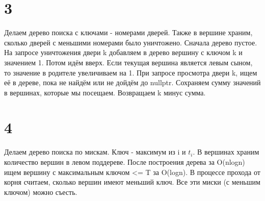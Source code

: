 \documentclass[12pt]{extarticle}
\begin{document}
\section*{3}
Делаем дерево поиска с ключами - номерами дверей. Также в вершине храним, сколько дверей с меньшими номерами было уничтожено.
\newline
Сначала дерево пустое. На запросе уничтожения двери k добавляем в дерево вершину с ключом k и значением 1. Потом идём вверх. Если текущая вершина является левым сыном, то значение в родителе увеличиваем на 1.
\newline
При запросе просмотра двери k, ищем её в дереве, пока не найдём или не дойдём до nullptr. Сохраняем сумму значений в вершинах, которые мы посещаем. Возвращаем k минус сумма.

\section*{4}
Делаем дерево поиска по мискам. Ключ - максимум из i и $t_i$. В вершинах храним количество вершин в левом поддереве.
\newline
После построения дерева за O(nlogn) ищем вершину с максимальным ключом <= T за O(logn). В процессе прохода от корня считаем, сколько вершин имеют меньший ключ. Все эти миски (с меньшим ключом) можно съесть.
\end{document}
